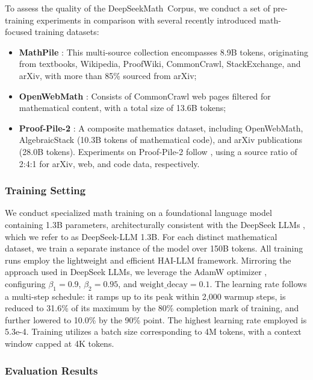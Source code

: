 To assess the quality of the DeepSeekMath~Corpus, we conduct a set of pre-training experiments in comparison with several recently introduced math-focused training datasets:

\begin{itemize}[topsep=0pt]
    \item \textbf{MathPile} \citep{mathpile}: This multi-source collection encompasses 8.9B tokens, originating from textbooks, Wikipedia, ProofWiki, CommonCrawl, StackExchange, and arXiv, with more than 85\% sourced from arXiv;
    \item \textbf{OpenWebMath} \citep{openwebmath}: Consists of CommonCrawl web pages filtered for mathematical content, with a total size of 13.6B tokens;
    \item \textbf{Proof-Pile-2} \citep{llemma}: A composite mathematics dataset, including OpenWebMath, AlgebraicStack (10.3B tokens of mathematical code), and arXiv publications (28.0B tokens). Experiments on Proof-Pile-2 follow \cite{llemma}, using a source ratio of 2:4:1 for arXiv, web, and code data, respectively.
\end{itemize}

\subsubsection{Training Setting}
\label{sec:quality-policy}
We conduct specialized math training on a foundational language model containing 1.3B parameters, architecturally consistent with the DeepSeek LLMs \citep{deepseek-llm}, which we refer to as DeepSeek-LLM 1.3B. For each distinct mathematical dataset, we train a separate instance of the model over 150B tokens. All training runs employ the lightweight and efficient HAI-LLM \citep{haillm} framework. Mirroring the approach used in DeepSeek LLMs, we leverage the AdamW optimizer \citep{adamW}, configuring $\beta_1=0.9$, $\beta_2=0.95$, and $\mathrm{weight\_decay}=0.1$. The learning rate follows a multi-step schedule: it ramps up to its peak within 2,000 warmup steps, is reduced to 31.6\% of its maximum by the 80\% completion mark of training, and further lowered to 10.0\% by the 90\% point. The highest learning rate employed is 5.3e-4. Training utilizes a batch size corresponding to 4M tokens, with a context window capped at 4K tokens.

\subsubsection{Evaluation Results}

